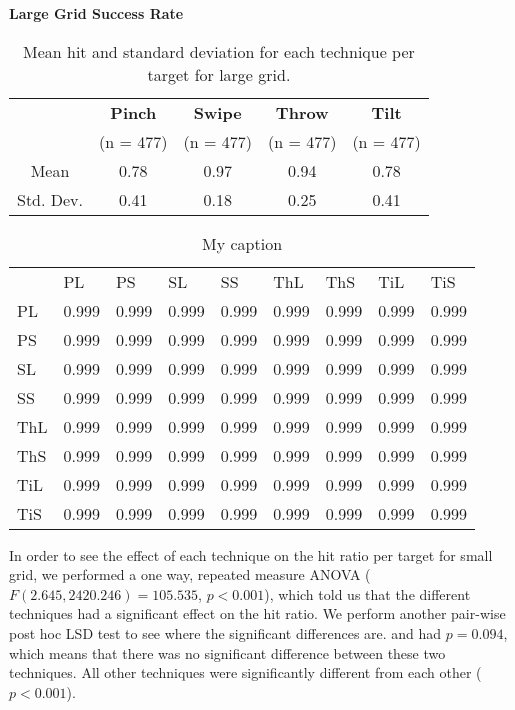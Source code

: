 \begin{table}[H]
	\centering
	\textbf{Large Grid Success Rate}\\[4pt]
	\begin{tabular}{|c|c|c|c|c|}
			\hline
			\rowcolor[HTML]{9B9B9B} 
			& \textbf{Pinch} & \textbf{Swipe} & \textbf{Throw} & \textbf{Tilt} \\
			\rowcolor[HTML]{9B9B9B} 
			 & (n = 477) & (n = 477) & (n = 477) & (n = 477) \\ \hline
			Mean & 0.78         & 0.97          & 0.94          & 0.78         \\ \hline
			Std. Dev. & 0.41 & 0.18 & 0.25 & 0.41 \\ \hline
	\end{tabular}
	\caption{Mean hit  and standard deviation for each technique per target for large grid.}
	\label{tab:meanHitTechniqueLarge}
\end{table}

\begin{table}[]
	\centering
	\caption{My caption}
	\label{my-label}
	\begin{adjustbox}{width=\columnwidth}
	\begin{tabular}{lllllllll}
		& PL    & PS    & SL    & SS    & ThL   & ThS   & TiL   & TiS   \\
		PL  & 0.999 & 0.999 & 0.999 & 0.999 & 0.999 & 0.999 & 0.999 & 0.999 \\
		PS  & 0.999 & 0.999 & 0.999 & 0.999 & 0.999 & 0.999 & 0.999 & 0.999 \\
		SL  & 0.999 & 0.999 & 0.999 & 0.999 & 0.999 & 0.999 & 0.999 & 0.999 \\
		SS  & 0.999 & 0.999 & 0.999 & 0.999 & 0.999 & 0.999 & 0.999 & 0.999 \\
		ThL & 0.999 & 0.999 & 0.999 & 0.999 & 0.999 & 0.999 & 0.999 & 0.999 \\
		ThS & 0.999 & 0.999 & 0.999 & 0.999 & 0.999 & 0.999 & 0.999 & 0.999 \\
		TiL & 0.999 & 0.999 & 0.999 & 0.999 & 0.999 & 0.999 & 0.999 & 0.999 \\
		TiS & 0.999 & 0.999 & 0.999 & 0.999 & 0.999 & 0.999 & 0.999 & 0.999
	\end{tabular}
	\end{adjustbox}
\end{table}

In order to see the effect of each technique on the hit ratio per target for small grid, we performed a one way, repeated measure ANOVA ($F(2.645,2420.246)=105.535$, $p<0.001$), which told us that the different techniques had a significant effect on the hit ratio. 
We perform another pair-wise post hoc LSD test to see where the significant differences are. \pinch and \tilt had $p=0.094$, which means that there was no significant difference between these two techniques. All other techniques were significantly different from each other ($p<0.001$). 

